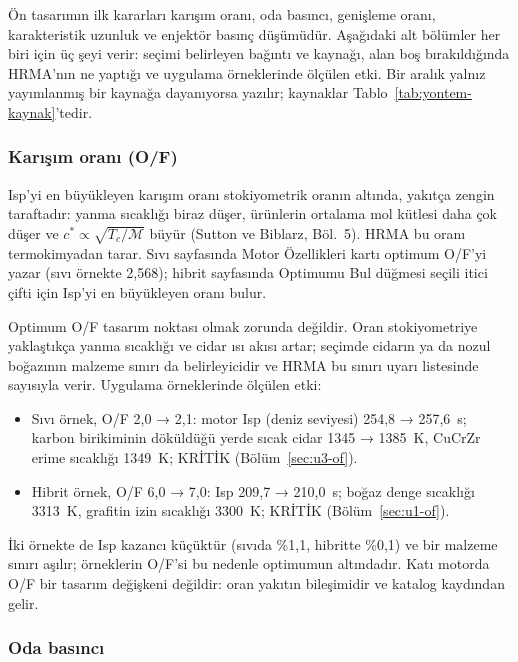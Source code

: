 \documentclass[11pt,a4paper]{article}
\newcommand{\ui}[1]{\textsf{#1}}
\begin{document}
Ön tasarımın ilk kararları karışım oranı, oda basıncı, genişleme oranı,
karakteristik uzunluk ve enjektör basınç düşümüdür. Aşağıdaki alt bölümler her
biri için üç şeyi verir: seçimi belirleyen bağıntı ve kaynağı, alan boş
bırakıldığında HRMA'nın ne yaptığı ve uygulama örneklerinde ölçülen etki. Bir
aralık yalnız yayımlanmış bir kaynağa dayanıyorsa yazılır; kaynaklar
Tablo~\ref{tab:yontem-kaynak}'tedir.

\subsubsection{Karışım oranı (O/F)}

Isp'yi en büyükleyen karışım oranı stokiyometrik oranın altında, yakıtça
zengin taraftadır: yanma sıcaklığı biraz düşer, ürünlerin ortalama mol kütlesi
daha çok düşer ve $c^* \propto \sqrt{T_c/\mathcal{M}}$ büyür (Sutton ve
Biblarz, Böl.~5). HRMA bu oranı termokimyadan tarar. Sıvı sayfasında
\ui{Motor Özellikleri} kartı optimum O/F'yi yazar (sıvı örnekte 2,568); hibrit
sayfasında \ui{Optimumu Bul} düğmesi seçili itici çifti için Isp'yi en
büyükleyen oranı bulur.

Optimum O/F tasarım noktası olmak zorunda değildir. Oran stokiyometriye
yaklaştıkça yanma sıcaklığı ve cidar ısı akısı artar; seçimde cidarın ya da
nozul boğazının malzeme sınırı da belirleyicidir ve HRMA bu sınırı uyarı
listesinde sayısıyla verir. Uygulama örneklerinde ölçülen etki:

\begin{itemize}[leftmargin=1.4em]
  \item Sıvı örnek, O/F 2,0 → 2,1: motor Isp (deniz seviyesi) 254,8 → 257,6~s;
  karbon birikiminin döküldüğü yerde sıcak cidar 1345 → 1385~K, CuCrZr erime
  sıcaklığı 1349~K; \ui{KRİTİK} (Bölüm~\ref{sec:u3-of}).
  \item Hibrit örnek, O/F 6,0 → 7,0: Isp 209,7 → 210,0~s; boğaz denge
  sıcaklığı 3313~K, grafitin izin sıcaklığı 3300~K; \ui{KRİTİK}
  (Bölüm~\ref{sec:u1-of}).
\end{itemize}

İki örnekte de Isp kazancı küçüktür (sıvıda \%1,1, hibritte \%0,1) ve bir
malzeme sınırı aşılır; örneklerin O/F'si bu nedenle optimumun altındadır. Katı motorda O/F bir
tasarım değişkeni değildir: oran yakıtın bileşimidir ve katalog kaydından gelir.

\subsubsection{Oda basıncı}
\end{document}
